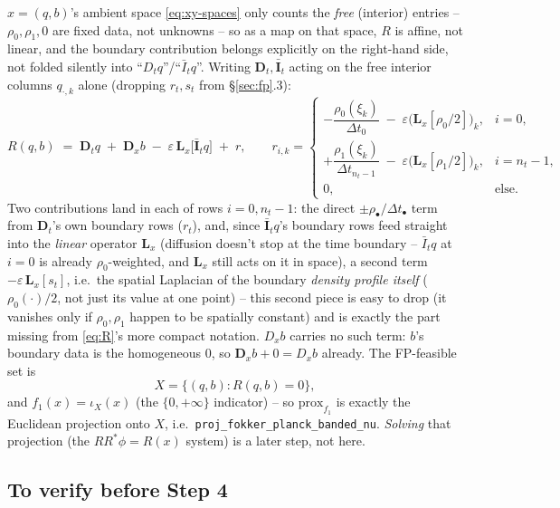 \documentclass[11pt]{article}
\newcommand{\code}[1]{\texttt{#1}}
\begin{document}
$x=(q,b)$'s ambient space \eqref{eq:xy-spaces} only counts the \emph{free} (interior)
entries -- $\rho_0,\rho_1,0$ are fixed data, not unknowns -- so as a map on that space,
$R$ is affine, not linear, and the boundary contribution belongs explicitly on the
right-hand side, not folded silently into ``$D_tq$''/``$\bar I_tq$''. Writing $\mathbf
D_t,\bar{\mathbf I}_t$ acting on the free interior columns $q_{\cdot,k}$ alone (dropping
$r_t,s_t$ from \S\ref{sec:fp}.3):
\begin{equation}
  \label{eq:R-affine}
  R(q,b) \;=\; \mathbf D_t q \;+\; \mathbf D_x b \;-\; \varepsilon\,\mathbf L_x\bigl[\bar{\mathbf I}_t q\bigr]
  \;+\; r, \qquad r_{i,k} =
  \begin{cases}
    -\dfrac{\rho_0(\xi_k)}{\Delta t_0} \;-\; \varepsilon\bigl(\mathbf L_x[\rho_0/2]\bigr)_k, & i=0, \\[10pt]
    +\dfrac{\rho_1(\xi_k)}{\Delta t_{n_t-1}} \;-\; \varepsilon\bigl(\mathbf L_x[\rho_1/2]\bigr)_k, & i=n_t-1, \\[8pt]
    0, & \text{else.}
  \end{cases}
\end{equation}
Two contributions land in each of rows $i=0,n_t{-}1$: the direct $\pm\rho_\bullet/\Delta
t_\bullet$ term from $\mathbf D_t$'s own boundary rows ($r_t$), and, since $\bar{\mathbf
I}_t q$'s boundary rows feed straight into the \emph{linear} operator $\mathbf L_x$
(diffusion doesn't stop at the time boundary -- $\bar I_t q$ at $i=0$ is already
$\rho_0$-weighted, and $\mathbf L_x$ still acts on it in space), a second term
$-\varepsilon\,\mathbf L_x[s_t]$, i.e.\ the spatial Laplacian of the boundary
\emph{density profile itself} ($\rho_0(\cdot)/2$, not just its value at one point) --
this second piece is easy to drop (it vanishes only if $\rho_0,\rho_1$ happen to be
spatially constant) and is exactly the part missing from \eqref{eq:R}'s more compact
notation. $D_xb$ carries no such term: $b$'s boundary data is the homogeneous $0$, so
$\mathbf D_x b + 0 = D_x b$ already. The FP-feasible set is
\begin{equation}
  X = \{(q,b) : R(q,b) = 0\},
\end{equation}
and $f_1(x) = \iota_X(x)$ (the $\{0,+\infty\}$ indicator) -- so $\mathrm{prox}_{f_1}$ is
exactly the Euclidean projection onto $X$, i.e.\ \code{proj\_fokker\_planck\_banded\_nu}.
\emph{Solving} that projection (the $R R^{\!*}\phi = R(x)$ system) is a later step, not
here.

\subsection*{To verify before Step 4}
\end{document}
